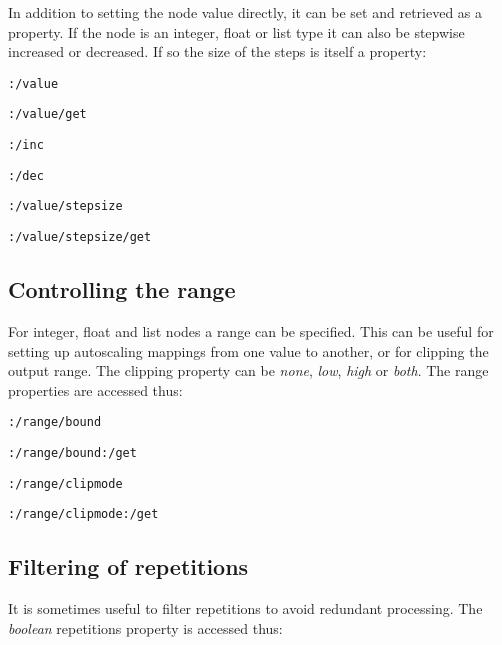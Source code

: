 \documentclass{NIME-alternate}
\begin{document}
In addition to setting the node value directly, it can be set and retrieved as a property. If the node is an integer, float or list type it can also be stepwise increased or decreased. If so the size of the steps is itself a property:

\texttt{:/value}

\texttt{:/value/get}

\texttt{:/inc}

\texttt{:/dec} 

\texttt{:/value/stepsize}

\texttt{:/value/stepsize/get}





\subsection{Controlling the range} %
\label{sub:range}

For integer, float and list nodes a range can be specified. This can be useful for setting up autoscaling mappings from one value to another, or for clipping the output range. The clipping property can be \emph{none}, \emph{low}, \emph{high} or \emph{both}. The range properties are accessed thus:

\texttt{:/range/bound}

\texttt{:/range/bound:/get}

\texttt{:/range/clipmode}

\texttt{:/range/clipmode:/get}





\subsection{Filtering of repetitions} %
\label{sub:filtering_of_repetitions}

It is sometimes useful to filter repetitions to avoid redundant processing. The \emph{boolean} repetitions property is accessed thus:
\end{document}
